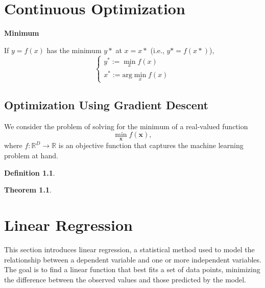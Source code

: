 \documentclass[12pt,openany]{book}
\newtheorem{theorem}{Theorem}[chapter]
\theoremstyle{definition}
\newtheorem{definition}{Definition}[chapter]
\newcommand{\R}{\mathbb{R}}
\newcommand{\ie}{\textnormal{i.e.}}
\newcommand{\mvec}[1]{\boldsymbol{#1}}
\renewcommand{\vec}[1]{\textbf{#1}}
\begin{document}
%	
%	
%	
	
	\newpage
	\chapter{Continuous Optimization}
	
	\textbf{Minimum}
	
	If $y=f(x)$ has the minimum $y*$ at $x=x*$ (\ie, $y*=f(x*)$), \[
	\begin{cases}
		y^*:=\min_x f(x)\\
		x^*:=\text{arg}\min_x f(x)
	\end{cases}
	\]
	\section{Optimization Using Gradient Descent}
	We consider the problem of solving for the minimum of a real-valued
	function \[
	\min_{\vec{x}}f(\vec{x}),
	\] where $f:\R^D\to\R$ is an objective function that captures the machine learning problem at hand.
	\begin{tcolorbox}[colframe=defcolor,title={\color{white}\bf }]
		\begin{definition}
			
		\end{definition}
	\end{tcolorbox}
	\begin{tcolorbox}[colframe=thmcolor,title={\color{white}\bf }]
		\begin{theorem}
			
		\end{theorem}
	\end{tcolorbox}

	\newpage
	\chapter{Linear Regression}
	This section introduces linear regression, a statistical method used to model the relationship between a dependent variable and one or more independent variables. The goal is to find a linear function that best fits a set of data points, minimizing the difference between the observed values and those predicted by the model.
	
\end{document}
